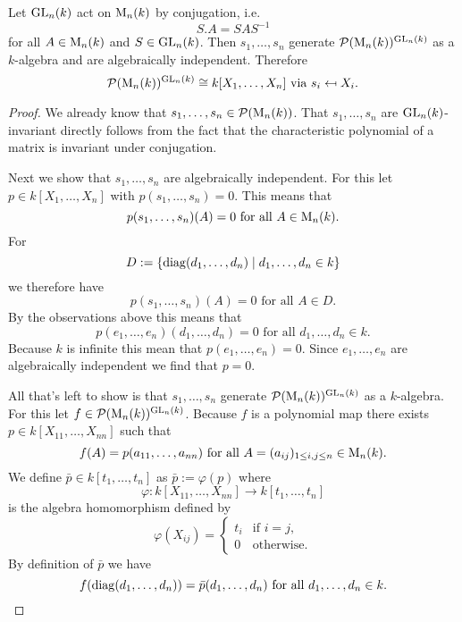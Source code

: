 \begin{thrm}
 Let $\operatorname{GL}_n(k)$ act on $\operatorname{M}_n(k)$ by conjugation, i.e.
 \[
  S.A = SAS^{-1}
 \]
 for all $A \in \operatorname{M}_n(k)$ and $S \in \operatorname{GL}_n(k)$. Then $s_1, \ldots, s_n$ generate $\mathcal{P}(\operatorname{M}_n(k))^{\operatorname{GL}_n(k)}$ as a $k$-algebra and are algebraically independent. Therefore
 \[
  \mathcal{P}(\operatorname{M}_n(k))^{\operatorname{GL}_n(k)} \cong k[X_1, \ldots, X_n] \text{ via } s_i \mapsfrom X_i.
 \]
\end{thrm}
\begin{proof}
 We already know that $s_1, \ldots, s_n \in \mathcal{P}(\operatorname{M}_n(k))$. That $s_1, \ldots, s_n$ are $\operatorname{GL}_n(k)$-invariant directly follows from the fact that the characteristic polynomial of a matrix is invariant under conjugation.
 
 Next we show that $s_1, \ldots, s_n$ are algebraically independent. For this let $p \in k[X_1, \ldots, X_n]$ with $p(s_1, \ldots, s_n) = 0$. This means that
 \[
  p(s_1, \ldots, s_n)(A) = 0 \text{ for all } A \in \operatorname{M}_n(k).
 \]
 For
 \[
  D := \{\operatorname{diag}(d_1, \ldots, d_n) \mid d_1, \ldots, d_n \in k\}
 \]
 we therefore have
 \[
  p(s_1, \ldots, s_n)(A) = 0 \text{ for all } A \in D.
 \]
 By the observations above this means that 
 \[
  p(e_1, \ldots, e_n)(d_1, \ldots, d_n) = 0 \text{ for all } d_1, \ldots, d_n \in k.
 \]
 Because $k$ is infinite this mean that $p(e_1, \ldots, e_n) = 0$. Since $e_1, \ldots, e_n$ are algebraically independent we find that $p =0$.
 
 All that’s left to show is that $s_1, \ldots, s_n$ generate $\mathcal{P}(\operatorname{M}_n(k))^{\operatorname{GL}_n(k)}$ as a $k$-algebra. For this let $f \in \mathcal{P}(\operatorname{M}_n(k))^{\operatorname{GL}_n(k)}$. Because $f$ is a polynomial map there exists $p \in k[X_{11}, \ldots, X_{nn}]$ such that
 \[
  f(A) = p(a_{11}, \ldots, a_{nn}) \text{ for all } A = (a_{ij})_{1 \leq i,j \leq n} \in \operatorname{M}_n(k).
 \]
 We define $\bar{p} \in k[t_1, \ldots, t_n]$ as $\bar{p} := \varphi(p)$ where
 \[
  \varphi : k[X_{11}, \ldots, X_{nn}] \to k[t_1, \ldots, t_n]
 \]
 is the algebra homomorphism defined by
 \[
  \varphi(X_{ij}) =
  \begin{cases}
   t_i & \text{if } i = j, \\
     0 & \text{otherwise}.
  \end{cases}
 \]
 By definition of $\bar{p}$ we have
 \[
  f(\operatorname{diag}(d_1, \ldots, d_n)) = \bar{p}(d_1, \ldots, d_n) \text{ for all } d_1, \ldots, d_n \in k.
 \]
 

\end{proof}

